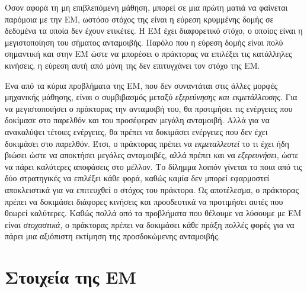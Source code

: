 Όσον αφορά τη μη επιβλεπόμενη μάθηση, μπορεί σε μια πρώτη ματιά να φαίνεται παρόμοια με την ΕΜ, ωστόσο στόχος της
είναι η εύρεση κρυμμένης δομής σε δεδομένα τα οποία δεν έχουν ετικέτες. Η ΕΜ έχει διαφορετικό στόχο, ο οποίος είναι η
μεγιστοποίηση του σήματος ανταμοιβής. Παρόλο που η εύρεση δομής είναι πολύ σημαντική και στην ΕΜ ώστε να μπορέσει ο πράκτορας
να επιλέξει τις κατάλληλες κινήσεις, η εύρεση αυτή από μόνη της δεν επιτυγχάνει τον στόχο της ΕΜ.

Ενα από τα κύρια προβλήματα της ΕΜ, που δεν συναντάται στις άλλες μορφές μηχανικής μάθησης, είναι
ο συμβιβασμός μεταξύ \textit{εξερεύνησης και εκμετάλλευσης}. Για να μεγιστοποιήσει ο πράκτορας την ανταμοιβή του,
θα προτιμήσει τις ενέργειες που δοκίμασε στο παρελθόν και του προσέφεραν μεγάλη ανταμοιβή. Αλλά
για να ανακαλύψει τέτοιες ενέργειες, θα πρέπει να δοκιμάσει ενέργειες που δεν έχει δοκιμάσει στο παρελθόν.
Έτσι, ο πράκτορας πρέπει να \textit{εκμεταλλευτεί} το τι έχει ήδη βιώσει ώστε να αποκτήσει μεγάλες ανταμοιβές,
αλλά πρέπει και να \textit{εξερευνήσει}, ώστε να πάρει καλύτερες αποφάσεις στο μέλλον. Το δίλημμα λοιπόν γίνεται
το ποια από τις δύο στρατηγικές να επιλέξει κάθε φορά, καθώς καμία δεν μπορεί εφαρμοστεί αποκλειστικά για
να επιτευχθεί ο στόχος του πράκτορα. Ως αποτέλεσμα, ο πράκτορας πρέπει να δοκιμάσει διάφορες
κινήσεις και προοδευτικά να προτιμήσει αυτές που θεωρεί καλύτερες. Καθώς πολλά από τα προβλήματα που
θέλουμε να λύσουμε με ΕΜ είναι \textit{στοχαστικά}, ο πράκτορας πρέπει να δοκιμάσει κάθε πράξη πολλές φορές
για να πάρει μια αξιόπιστη εκτίμηση της προσδοκώμενης ανταμοιβής.


\section{Στοιχεία της ΕΜ}

